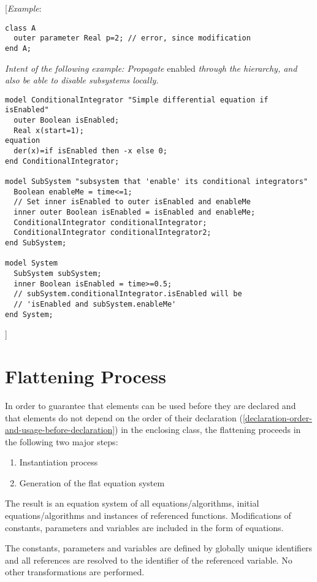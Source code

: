 {[}\emph{Example}:
\begin{lstlisting}[language=modelica]
class A
  outer parameter Real p=2; // error, since modification
end A;
\end{lstlisting}

\emph{Intent of the following example: Propagate} enabled \emph{through
the hierarchy, and also be able to disable subsystems locally.}
\begin{lstlisting}[language=modelica]
model ConditionalIntegrator "Simple differential equation if isEnabled"
  outer Boolean isEnabled;
  Real x(start=1);
equation
  der(x)=if isEnabled then -x else 0;
end ConditionalIntegrator;

model SubSystem "subsystem that 'enable' its conditional integrators"
  Boolean enableMe = time<=1;
  // Set inner isEnabled to outer isEnabled and enableMe
  inner outer Boolean isEnabled = isEnabled and enableMe;
  ConditionalIntegrator conditionalIntegrator;
  ConditionalIntegrator conditionalIntegrator2;
end SubSystem;

model System
  SubSystem subSystem;
  inner Boolean isEnabled = time>=0.5;
  // subSystem.conditionalIntegrator.isEnabled will be
  // 'isEnabled and subSystem.enableMe'
end System;
\end{lstlisting}
{]}

\section{Flattening Process}

In order to guarantee that elements can be used before they are declared
and that elements do not depend on the order of their declaration
(\ref{declaration-order-and-usage-before-declaration}) in the enclosing class, the flattening proceeds in the
following two major steps:

\begin{enumerate}
\item
  Instantiation process
\item
  Generation of the flat equation system
\end{enumerate}

The result is an equation system of all equations/algorithms, initial
equations/algorithms and instances of referenced functions.
Modifications of constants, parameters and variables are included in the
form of equations.

The constants, parameters and variables are defined by globally unique
identifiers and all references are resolved to the identifier of the
referenced variable. No other transformations are performed.

